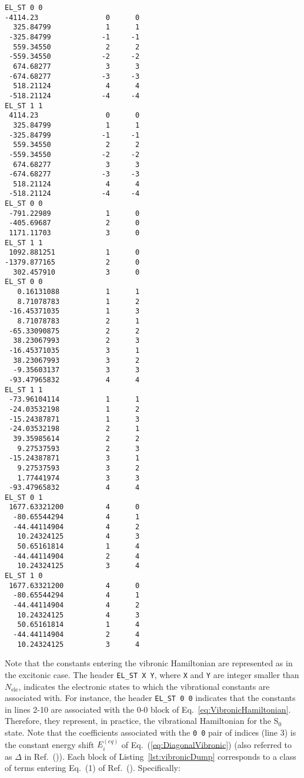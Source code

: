 \documentclass[bibliography=totoc,12pt,a4paper]{scrartcl}
\begin{document}
\begin{lstlisting}[language=qcmaquis,caption={Vibronic integral file format.},
				   label=lst:vibronicDump]
EL_ST 0 0
-4114.23                0      0
  325.84799             1      1     
 -325.84799            -1     -1
  559.34550             2      2     
 -559.34550            -2     -2
  674.68277             3      3     
 -674.68277            -3     -3     
  518.21124             4      4     
 -518.21124            -4     -4     
EL_ST 1 1
 4114.23                0      0
  325.84799             1      1     
 -325.84799            -1     -1
  559.34550             2      2     
 -559.34550            -2     -2
  674.68277             3      3     
 -674.68277            -3     -3     
  518.21124             4      4     
 -518.21124            -4     -4     
EL_ST 0 0
 -791.22989             1      0
 -405.69687             2      0
 1171.11703             3      0
EL_ST 1 1
 1092.881251            1      0
-1379.877165            2      0
  302.457910            3      0
EL_ST 0 0
   0.16131088           1      1
   8.71078783           1      2
 -16.45371035           1      3
   8.71078783           2      1
 -65.33090875           2      2
  38.23067993           2      3
 -16.45371035           3      1
  38.23067993           3      2
  -9.35603137           3      3
 -93.47965832           4      4
EL_ST 1 1 
 -73.96104114           1      1
 -24.03532198           1      2
 -15.24387871           1      3
 -24.03532198           2      1
  39.35985614           2      2
   9.27537593           2      3
 -15.24387871           3      1
   9.27537593           3      2
   1.77441974           3      3
 -93.47965832           4      4
EL_ST 0 1
 1677.63321200          4      0
  -80.65544294          4      1
  -44.44114904          4      2
   10.24324125          4      3
   50.65161814          1      4
  -44.44114904          2      4
   10.24324125          3      4
EL_ST 1 0
 1677.63321200          4      0
  -80.65544294          4      1
  -44.44114904          4      2
   10.24324125          4      3
   50.65161814          1      4
  -44.44114904          2      4
   10.24324125          3      4
\end{lstlisting}

Note that the constants entering the vibronic Hamiltonian are represented as in the excitonic case.
The header \texttt{EL\_ST X Y}, where \texttt{X} and \texttt{Y} are integer smaller than $N_\text{ele}$, indicates the electronic states to which the vibrational constants are associated with.
For instance, the header \texttt{EL\_ST 0 0} indicates that the constants in lines 2-10 are associated with the 0-0 block of Eq.~\ref{eq:VibronicHamiltonian}.
Therefore, they represent, in practice, the vibrational Hamiltonian for the S$_0$ state.
Note that the coefficients associated with the \texttt{0   0} pair of indices (line 3) is the constant energy shift $E_i^{(eq)}$ of Eq.~(\ref{eq:DiagonalVibronic}) (also referred to as $\Delta$ in Ref.~()).
Each block of Listing~\ref{lst:vibronicDump} corresponds to a class of terms entering Eq.~(1) of Ref.~().
Specifically:
\end{document}
